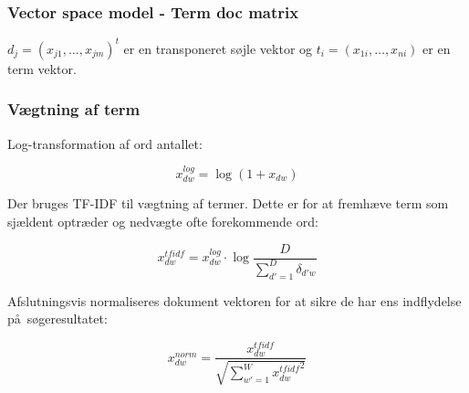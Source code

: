 \documentclass[xcolor=table]{beamer}
\begin{document}
\begin{frame}

  \frametitle{Vector space model - Term doc matrix}

  \begin{center}
  \end{center}

  $d_j = (x_{j1}, \ldots, x_{jm})^t$ er en transponeret s\o jle vektor og $t_i = (x_{1i}, \ldots, x_{ni})$ er en term vektor.

\end{frame}

\begin{frame}

  \frametitle{V\ae gtning af term}

  Log-transformation af ord antallet:

  \[
  x_{dw}^{log} = \log{(1 + x_{dw})}
  \]

  Der bruges TF-IDF til v\ae gtning af termer. Dette er for at fremh\ae ve term som sj\ae ldent optr\ae der og nedv\ae gte ofte forekommende ord:

  \[
  x_{dw}^{tfidf} = x_{dw}^{log} \cdot \log{\frac{D}{\sum_{d\prime = 1}^{D}\delta_{d\prime w}}}
  \]

  Afslutningsvis normaliseres dokument vektoren for at sikre de har ens indflydelse p\aa\ s\o geresultatet:

  \[
  x_{dw}^{norm} = \frac{x_{dw}^{tfidf}}{\sqrt{\sum_{w\prime = 1}^{W} {x_{dw}^{tfidf}}^{2}}}
  \]

\end{frame}
\end{document}
